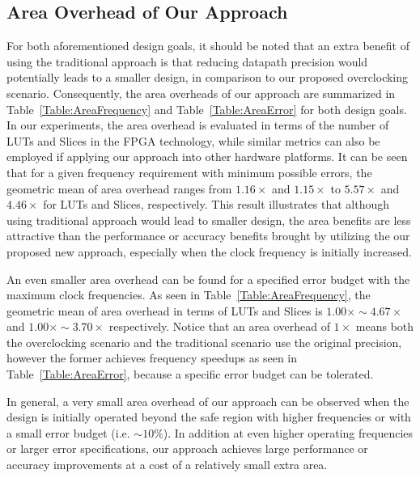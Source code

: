 \documentclass[prodmode,acmtrets]{acmsmall} %
\begin{document}
\subsection{Area Overhead of Our Approach}
For both aforementioned design goals, it should be noted that an extra benefit of using the traditional approach is that reducing datapath precision would potentially leads to a smaller design, in comparison to our proposed overclocking scenario. Consequently, the area overheads of our approach are summarized in Table~\ref{Table:AreaFrequency} and Table~\ref{Table:AreaError} for both design goals. In our experiments, the area overhead is evaluated in terms of the number of LUTs and Slices in the FPGA technology, while similar metrics can also be employed if applying our approach into other hardware platforms. It can be seen that for a given frequency requirement with minimum possible errors, the geometric mean of area overhead ranges from $1.16\times$ and $1.15\times$ to $5.57\times$ and $4.46\times$ for LUTs and Slices, respectively. This result illustrates that although using traditional approach would lead to smaller design, the area benefits are less attractive than the performance or accuracy benefits brought by utilizing the our proposed new approach, especially when the clock frequency is initially increased.

An even smaller area overhead can be found for a specified error budget with the maximum clock frequencies. As seen in Table~\ref{Table:AreaFrequency}, the geometric mean of area overhead in terms of LUTs and Slices is $1.00\times\sim4.67\times$ and $1.00\times\sim3.70\times$ respectively. Notice that an area overhead of $1\times$ means both the overclocking scenario and the traditional scenario use the original precision, however the former achieves frequency speedups as seen in Table~\ref{Table:AreaError}, because a specific error budget can be tolerated.


In general, a very small area overhead of our approach can be observed when the design is initially operated beyond the safe region with higher frequencies or with a small error budget (i.e. $\sim10\%$). In addition at even higher operating frequencies or larger error specifications, our approach achieves large performance or accuracy improvements at a cost of a relatively small extra area.
\end{document}

